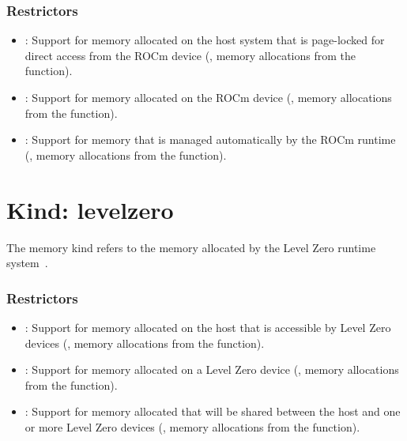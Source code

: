 \subsubsection{Restrictors}

\begin{itemize}

\item {}: Support for memory allocated on the host system that
    is page-locked for direct access from the ROCm device (\eg, memory
        allocations from the  function).

\item {}: Support for memory allocated on the ROCm device
    (\eg, memory allocations from the  function).

\item {}: Support for memory that is managed automatically
    by the ROCm runtime (\eg, memory allocations from the
         function).

\end{itemize}

\section{Kind: levelzero}

The  memory kind refers to the memory allocated by the
Level Zero runtime system~\cite{zeref}.

\subsubsection{Restrictors}

\begin{itemize}

\item {}: Support for memory allocated on the host that is
    accessible by Level Zero devices (\eg, memory allocations from the
         function).

\item {}: Support for memory allocated on a Level Zero device
    (\eg, memory allocations from the  function). 

\item {}: Support for memory allocated that will be shared
    between the host and one or more Level Zero devices (\eg,
        memory allocations from the  function).

\end{itemize}
